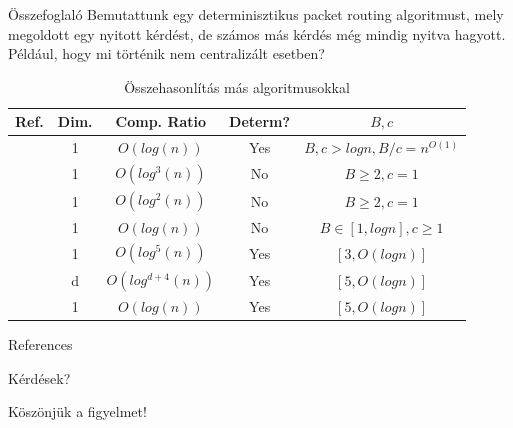 \documentclass[10pt]{beamer}
\begin{document}
\begin{frame}{Összefoglaló}
  Bemutattunk egy determinisztikus packet routing algoritmust, mely megoldott egy nyitott kérdést, de számos más kérdés még mindig nyitva hagyott. Például, hogy mi történik nem centralizált esetben?
  \begin{table}
  	\begin{tabular}{ c c c c c }
  		\toprule
  		Ref. & Dim. & Comp. Ratio & Determ? & $ B, c $ \\
  		\midrule
  			\cite{even2010logn, even2011online, evenM14} & 1 & $ O(log(n)) $ & Yes & $ B, c > log n, B/c = n^{O(1)} $ \\
  			\cite{angelov2009network} & 1 & $ O(log^3(n)) $ & No & $ B \geq 2, c = 1 $ \\
			\cite{azar2005packet} & 1 & $ O(log^2(n)) $ & No & $ B \geq 2, c = 1 $ \\
			\cite{even2010logn, evenM14} & 1 & $ O(log(n)) $ & No & $ B \in [1, log n], c \geq 1 $ \\
			\cite{even2011online, evenM14} & 1 & $ O(log^5(n)) $ & Yes & $ [3, O(log n)] $ \\
			\cite{even2011online, evenM14} & d & $ O(log^{d+4}(n)) $ & Yes & $ [5, O(log n)] $ \\
			\hline
			\cite{even2015better} & 1 & $ O(log(n)) $ & Yes & $ [5, O(log n)] $ \\
		\bottomrule
	\end{tabular}
	\caption{Összehasonlítás más algoritmusokkal}
  \end{table}
\end{frame}

\appendix

\begin{frame}[allowframebreaks]{References}
	
	
	
	
\end{frame}

\begin{frame}[standout]
  Kérdések?
\end{frame}

\begin{frame}[standout]
	Köszönjük a figyelmet!
\end{frame}
\end{document}

